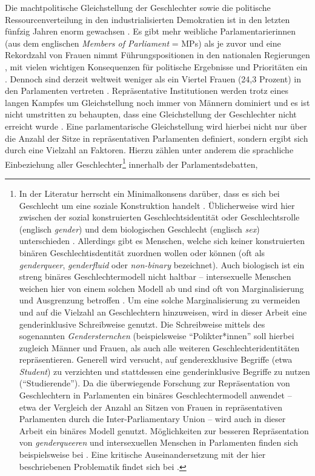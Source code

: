 \documentclass[12pt, 
    twoside=false, 
    bibliography=totoc, 
    numbers=endperiod, 
    headings=normal, 
    toc=chapterentrydotfill
    ]{scrbook}
\begin{document}
\noindent
Die machtpolitische Gleichstellung der Geschlechter sowie die politische Ressourcenverteilung in den industrialisierten Demokratien ist in den letzten fünfzig Jahren enorm gewachsen \parencite[318]{coffe_2010}. Es gibt mehr weibliche Parlamentarierinnen (aus dem englischen \emph{Members of Parliament} = MPs) als je zuvor und eine Rekordzahl von Frauen nimmt Führungspositionen in den nationalen Regierungen \parencites{lovenduski_2005}{paxton_2007}, mit vielen wichtigen Konsequenzen für politische Ergebnisse und Prioritäten ein \parencites{bolzendahl_2007}{carroll_2001}{waring_2000}[318]{coffe_2010}. Dennoch sind derzeit weltweit weniger als ein Viertel Frauen (24,3 Prozent) in den Parlamenten vertreten \parencite{ipu_2019}. Repräsentative Institutionen werden trotz eines langen Kampfes um Gleichstellung noch immer von Männern dominiert \parencites[149]{celis_2018}[497 f.]{childs_2013}{dahlerup_2013} {bjarnegard_2013} und es ist nicht umstritten zu behaupten, dass eine Gleichstellung der Geschlechter nicht erreicht wurde \parencite[150]{celis_2018}. Eine parlamentarische Gleichstellung wird hierbei nicht nur über die Anzahl der Sitze in repräsentativen Parlamenten definiert, sondern ergibt sich durch eine Vielzahl an Faktoren. Hierzu zählen unter anderem die sprachliche Einbeziehung aller Geschlechter\footnote{In der Literatur herrscht ein Minimalkonsens darüber, dass es sich bei Geschlecht um eine soziale Konstruktion handelt \parencite[2]{meissner_2008}. Üblicherweise wird hier zwischen der sozial konstruierten Geschlechtsidentität oder Geschlechtsrolle (englisch \emph{gender}) und dem biologischen Geschlecht (englisch \emph{sex}) unterschieden \parencite[3f.]{meissner_2008}. Allerdings gibt es Menschen, welche sich keiner konstruierten binären Geschlechtisdentität zuordnen wollen oder können (oft als \emph{genderqueer}, \emph{genderfluid} oder \emph{non-binary} bezeichnet). Auch biologisch ist ein streng binäres Geschlechtermodell nicht haltbar -- intersexuelle Menschen weichen hier von einem solchen Modell ab und sind oft von Marginalisierung und Ausgrenzung betroffen \parencite[vgl.][]{richards_2016}. Um eine solche Marginalisierung zu vermeiden und auf die Vielzahl an Geschlechtern hinzuweisen, wird in dieser Arbeit eine genderinklusive Schreibweise genutzt. Die Schreibweise mittels des sogenannten \emph{Gendersternchen} (beispielsweise \enquote{Polikter*innen} soll hierbei zugleich Männer und Frauen, als auch alle weiteren Geschlechteridentitäten repräsentieren. Generell wird versucht, auf genderexklusive Begriffe (etwa \emph{Student}) zu verzichten und stattdessen eine genderinklusive Begriffe zu nutzen (\enquote{Studierende}). Da die überwiegende Forschung zur Repräsentation von Geschlechtern in Parlamenten ein binäres Geschlechtermodell anwendet -- etwa der Vergleich der Anzahl an Sitzen von Frauen in repräsentativen Parlamenten durch die Inter-Parliamentary Union \textcite{ipu_2019} -- wird auch in dieser Arbeit ein binäres Modell genutzt. Möglichkeiten zur besseren Repräsentation von \emph{genderqueeren} und intersexuellen Menschen in Parlamenten finden sich beispielsweise bei \textcite{squires_2008}. Eine kritische Auseinandersetzung mit der hier beschriebenen Problematik findet sich bei \parencite[6ff.]{meissner_2008}.} innerhalb der Parlamentsdebatten, 
\end{document}
